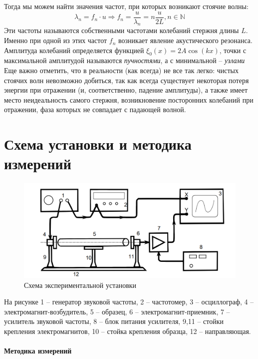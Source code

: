 \documentclass[a4paper,12pt]{article}
\begin{document}
	Тогда мы можем найти значения частот, при которых возникают стоячие волны:
	\begin{equation}
		\label{fn}
		\lambda_n=f_n\cdot u \Rightarrow f_n=\frac{u}{\lambda_n}=n\frac{u}{2L}, n\in \mathbb{N}
	\end{equation}
	Эти частоты называются собственными частотами колебаний стержня длины $L$. Именно при одной из этих частот $f_n$ возникает явление акустического резонанса.\\
	
	Амплитуда колебаний определяется функцией $\xi_0(x)=2A\cos(kx)$, точки с максимальной амплитудой называются \textit{пучностями}, а с минимальной -- \textit{узлами}\\
	
	Еще важно отметить, что в реальности (как всегда) не все так легко: чистых стоячих волн невозможно добиться, так как всегда существует некоторая потеря энергии при отражении (и, соответственно, падение амплитуды), а также имеет место неидеальность самого стержня, возникновение посторонних колебаний при отражении, фаза которых не совпадает с падающей волной.
	
	\section{Схема установки и методика измерений}
	\begin{figure}[H]
		\centering
		\includegraphics[width=0.7\linewidth]{fig2}
		\caption{Схема экспериментальной установки}
		\label{fig:fig2}
	\end{figure}
	На рисунке 1 -- генератор звуковой частоты, 2 -- частотомер, 3 -- осциллограф, 4 -- электромагнит-возбудитель, 5 -- образец, 6 -- электромагнит-приемник, 7 -- усилитель звуковой частоты, 8 -- блок питания усилителя, 9,11 -- стойки крепления электромагнитов, 10 -- стойка крепления образца, 12 -- направляющая.
	
	\paragraph{Методика измерений}
	
\end{document}
